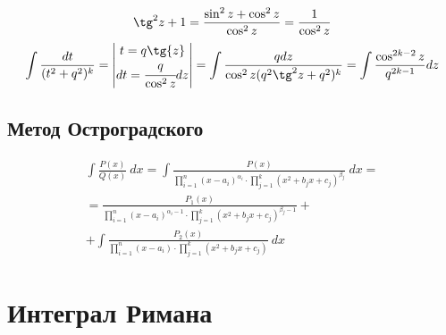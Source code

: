 \begin{comm}
    \[\tg^2z+1=\frac{\sin^2z+\cos^2z}{\cos^2z}=\frac{1}{\cos^2z}\]
    \[\int \frac{dt}{(t^2+q^2)^k}=\begin{vmatrix} t=q\tg{z}\\ dt=\cfrac{q}{\cos^2z}dz\end{vmatrix}=\int \frac{qdz}{\cos^2z(q^2\tg^2z+q^2)^k}=\int \frac{\cos^{2k-2}z}{q^{2k-1}}dz\]
\end{comm}
\subsection{Метод Остроградского}
\begin{multline*}
    \int \frac{P(x)}{Q(x)}\ dx=\int \frac{P(x)}{\prod\limits_{i=1}^{n}(x-a_i)^{\alpha_i}\cdot \prod\limits_{j=1}^{k}(x^2+b_j x+c_j)^{\beta_j}}\ dx=\\
    =\frac{P_1(x)}{\prod\limits_{i=1}^{n}(x-a_i)^{\alpha_i-1}\cdot \prod\limits_{j=1}^{k}(x^2+b_j x+c_j)^{\beta_j-1}}+\\
    +\int \frac{P_2(x)}{\prod\limits_{i=1}^{n}(x-a_i)\cdot \prod\limits_{j=1}^{k}(x^2+b_j x+c_j)}\ dx
\end{multline*}
\section{Интеграл Римана}
